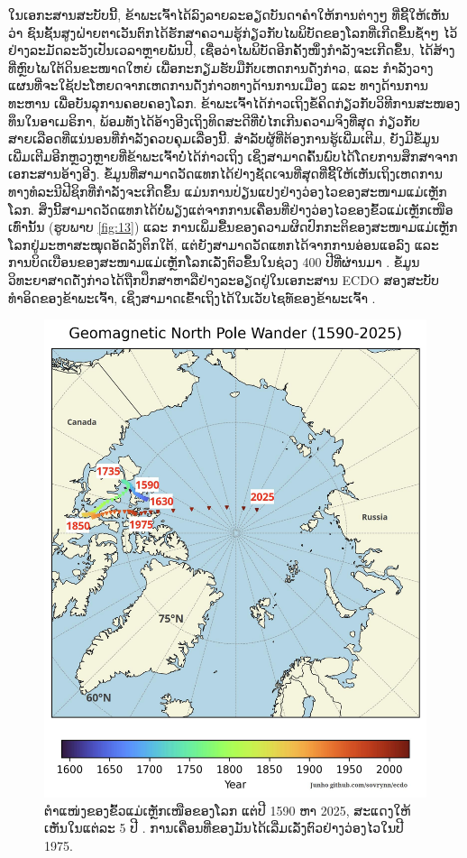 \documentclass[10pt,twocolumn,letterpaper]{article}
\begin{document}
ໃນເອກະສານສະບັບນີ້, ຂ້າພະເຈົ້າໄດ້ລົງລາຍລະອຽດບັນດາຄຳໃຫ້ການຕ່າງໆ ທີ່ຊີ້ໃຫ້ເຫັນວ່າ ຊົນຊັ້ນສູງຝ່າຍຕາເວັນຕົກໄດ້ຮັກສາຄວາມຮູ້ກ່ຽວກັບໄພພິບັດຂອງໂລກທີ່ເກີດຂຶ້ນຊ້ຳໆ ໄວ້ຢ່າງລະມັດລະວັງເປັນເວລາຫຼາຍພັນປີ, ເຊື່ອວ່າໄພພິບັດອີກຄັ້ງໜຶ່ງກຳລັງຈະເກີດຂຶ້ນ, ໄດ້ສ້າງທີ່ຫຼົບໄພໃຕ້ດິນຂະໜາດໃຫຍ່ ເພື່ອກະກຽມຮັບມືກັບເຫດການດັ່ງກ່າວ, ແລະ ກຳລັງວາງແຜນທີ່ຈະໃຊ້ປະໂຫຍດຈາກເຫດການດັ່ງກ່າວທາງດ້ານການເມືອງ ແລະ ທາງດ້ານການທະຫານ ເພື່ອບັນລຸການຄອບຄອງໂລກ. 
ຂ້າພະເຈົ້າໄດ້ກ່າວເຖິງຂໍ້ຄິດກ່ຽວກັບວິທີການສະໜອງທຶນໃນອາເມຣິກາ, ພ້ອມທັງໄດ້ອ້າງອີງເຖິງທິດສະດີທີ່ບໍ່ໄກເກີນຄວາມຈິງທີ່ສຸດ ກ່ຽວກັບສາຍເລືອດທີ່ແນ່ນອນທີ່ກຳລັງຄວບຄຸມເລື່ອງນີ້. 
ສຳລັບຜູ້ທີ່ຕ້ອງການຮູ້ເພີ່ມເຕີມ, ຍັງມີຂໍ້ມູນເພີ່ມເຕີມອີກຫຼວງຫຼາຍທີ່ຂ້າພະເຈົ້າບໍ່ໄດ້ກ່າວເຖິງ ເຊິ່ງສາມາດຄົ້ນພົບໄດ້ໂດຍການສຶກສາຈາກເອກະສານອ້າງອີງ.
ຂໍ້ມູນທີ່ສາມາດວັດແທກໄດ້ຢ່າງຊັດເຈນທີ່ສຸດທີ່ຊີ້ໃຫ້ເຫັນເຖິງເຫດການທາງທໍລະນີຟີຊິກທີ່ກຳລັງຈະເກີດຂຶ້ນ ແມ່ນການປ່ຽນແປງຢ່າງວ່ອງໄວຂອງສະໜາມແມ່ເຫຼັກໂລກ.
ສິ່ງນີ້ສາມາດວັດແທກໄດ້ບໍ່ພຽງແຕ່ຈາກການເຄື່ອນທີ່ຢ່າງວ່ອງໄວຂອງຂົ້ວແມ່ເຫຼັກເໜືອເທົ່ານັ້ນ (ຮູບພາບ \ref{fig:13}) ແລະ ການເພິ່ມຂື້ນຂອງຄວາມຜິດປົກກະຕິຂອງສະໜາມແມ່ເຫຼັກໂລກຢູ່ມະຫາສະໝຸດອັດລັງຕິກໃຕ້, ແຕ່ຍັງສາມາດວັດແທກໄດ້ຈາກການອ່ອນແອລົງ ແລະ ການບິດເບືອນຂອງສະໜາມແມ່ເຫຼັກໂລກເລັ່ງຕົວຂຶ້ນໃນຊ່ວງ 400 ປີທີ່ຜ່ານມາ \cite{3}. 
ຂໍ້ມູນວິທະຍາສາດດັ່ງກ່າວໄດ້ຖືກປຶກສາຫາລືຢ່າງລະອຽດຢູ່ໃນເອກະສານ ECDO ສອງສະບັບທຳອິດຂອງຂ້າພະເຈົ້າ, ເຊິ່ງສາມາດເຂົ້າເຖິງໄດ້ໃນເວັບໄຊທ໌ຂອງຂ້າພະເຈົ້າ \cite{3}. 
\begin{figure}[t]
\begin{center}
   \includegraphics[width=1\linewidth]{npw.jpg}
\end{center}
   \caption{ຕໍາແໜ່ງຂອງຂົ້ວແມ່ເຫຼັກເໜືອຂອງໂລກ ແຕ່ປີ 1590 ຫາ 2025, ສະແດງໃຫ້ເຫັນໃນແຕ່ລະ 5 ປີ \cite{41}.
ການເຄື່ອນທີ່ຂອງມັນໄດ້ເລີ່ມເລັ່ງຕົວຢ່າງວ່ອງໄວໃນປີ 1975.}
\label{fig:13}
\label{fig:onecol}
\end{figure}
\end{document}
